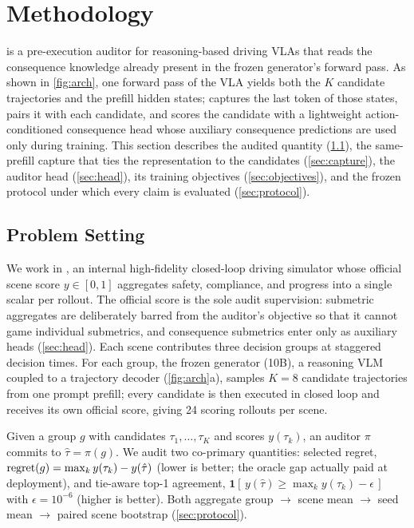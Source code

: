 \section{Methodology}
\label{sec:method}

\headname{} is a pre-execution auditor for reasoning-based driving VLAs that reads the consequence knowledge already present in the frozen generator's forward pass.
As shown in \cref{fig:arch}, one forward pass of the VLA yields both the $K$ candidate trajectories and the prefill hidden states; \headname{} captures the last token of those states, pairs it with each candidate, and scores the candidate with a lightweight action-conditioned consequence head whose auxiliary consequence predictions are used only during training.
This section describes the audited quantity (\cref{sec:setting}), the same-prefill capture that ties the representation to the candidates (\cref{sec:capture}), the auditor head (\cref{sec:head}), its training objectives (\cref{sec:objectives}), and the frozen protocol under which every claim is evaluated (\cref{sec:protocol}).

\subsection{Problem Setting}
\label{sec:setting}

We work in \simname, an internal high-fidelity closed-loop driving simulator whose official scene score $y\in[0,1]$ aggregates safety, compliance, and progress into a single scalar per rollout.
The official score is the sole audit supervision: submetric aggregates are deliberately barred from the auditor's objective so that it cannot game individual submetrics, and consequence submetrics enter only as auxiliary heads (\cref{sec:head}).
Each scene contributes three decision groups at staggered decision times.
For each group, the frozen generator \vlaname{} (10B), a reasoning VLM coupled to a trajectory decoder (\cref{fig:arch}a), samples $K{=}8$ candidate trajectories from one prompt prefill; every candidate is then executed in closed loop and receives its own official score, giving 24 scoring rollouts per scene.

Given a group $g$ with candidates $\tau_1,\dots,\tau_K$ and scores $y(\tau_k)$, an auditor $\pi$ commits to $\hat\tau=\pi(g)$.
We audit two co-primary quantities:
selected regret, $\mathrm{regret}(g) = \max_k y(\tau_k) - y(\hat\tau)$ (lower is better; the oracle gap actually paid at deployment), and
tie-aware top-1 agreement, $\mathbf{1}[\,y(\hat\tau) \ge \max_k y(\tau_k) - \epsilon\,]$ with $\epsilon=10^{-6}$ (higher is better).
Both aggregate group $\rightarrow$ scene mean $\rightarrow$ seed mean $\rightarrow$ paired scene bootstrap (\cref{sec:protocol}).


